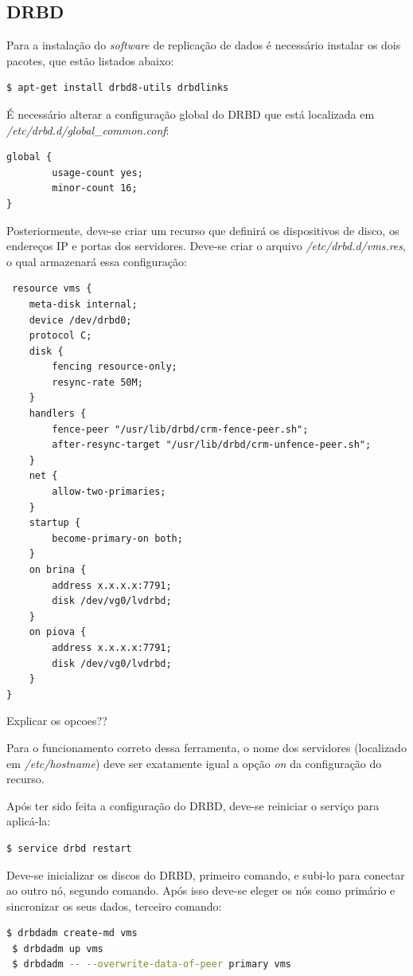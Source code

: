 \subsection{DRBD}

Para a instalação do \textit{software} de replicação de dados é necessário instalar os dois pacotes, que estão listados abaixo:
\begin{lstlisting}[language=bash]
 $ apt-get install drbd8-utils drbdlinks
\end{lstlisting}

É necessário alterar a configuração global do \ac{DRBD} que está localizada em \textit{/etc/drbd.d/global\_common.conf}:
\begin{lstlisting}
global {
        usage-count yes;
        minor-count 16;
}
\end{lstlisting}

Posteriormente, deve-se criar um recurso que definirá os dispositivos de disco, os endereços \ac{IP} e portas dos servidores.
Deve-se criar o arquivo \textit{/etc/drbd.d/vms.res}, o qual armazenará essa configuração:
\begin{lstlisting}
 resource vms {
    meta-disk internal;
    device /dev/drbd0;
    protocol C;
    disk {
        fencing resource-only;
        resync-rate 50M;
    }
    handlers {
        fence-peer "/usr/lib/drbd/crm-fence-peer.sh";
        after-resync-target "/usr/lib/drbd/crm-unfence-peer.sh";
    }
    net {
        allow-two-primaries;
    }
    startup {
        become-primary-on both;
    }
    on brina {
        address x.x.x.x:7791;
        disk /dev/vg0/lvdrbd;
    }
    on piova {
        address x.x.x.x:7791;
        disk /dev/vg0/lvdrbd;
    }
}
\end{lstlisting}
Explicar os opcoes??

Para o funcionamento correto dessa ferramenta, o nome dos servidores (localizado em \textit{/etc/hostname}) deve ser exatamente igual a opção
\textit{on} da configuração do recurso.

Após ter sido feita a configuração do \ac{DRBD}, deve-se reiniciar o serviço para aplicá-la:
\begin{lstlisting}[language=bash]
 $ service drbd restart 
\end{lstlisting}

Deve-se inicializar os discos do \ac{DRBD}, primeiro comando, e subi-lo para conectar ao outro nó, segundo comando. Após isso deve-se eleger
os nós como primário e sincronizar os seus dados, terceiro comando:
\begin{lstlisting}[language=bash]
 $ drbdadm create-md vms
 $ drbdadm up vms
 $ drbdadm -- --overwrite-data-of-peer primary vms
\end{lstlisting}

